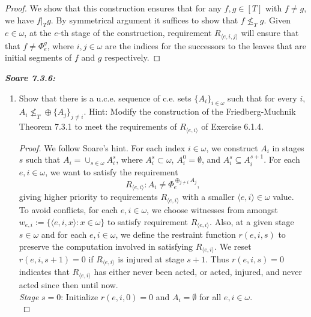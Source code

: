 \documentclass{article}
\begin{document}
\begin{proof}
    We show that this construction ensures that for any $f,g\in[T]$ with
    $f\neq g$, we have $f|_Tg$. By symmetrical argument it suffices to show
    that $f\not\leq_T g$. Given $e\in\omega$, at the $e$-th stage of the
    construction, requirement $R_{\langle e,i,j\rangle}$ will ensure that
    that $f\neq\Phi_e^g$, where $i,j\in\omega$ are the indices for the
    successors to the leaves that are initial segments of $f$ and $g$
    respectively. 
  \end{proof}

\it \textbf{Soare 7.3.6:}
  \begin{enumerate}[label={(\roman*)}]
    \item Show that there is a u.c.e. sequence of c.e. sets
      $\{A_i\}_{i\in\omega}$ such that for every $i$, $A_i\not\leq_T \oplus
      \{A_j\}_{j\neq i}$. Hint: Modify the construction of the
      Friedberg-Muchnik Theorem 7.3.1 to meet the requirements of
      $R_{\langle e,i\rangle}$ of Exercise 6.1.4.

      \begin{proof}
        We follow Soare's hint. For each index $i\in\omega$, we construct
        $A_i$ in stages $s$ such that $A_i=\cup_{s\in\omega}A_i^s$, where
        $A_i^s\subset\omega$, $A_i^0=\emptyset$, and $A_i^s\subseteq
        A_i^{s+1}$. For each $e,i\in\omega$, we want to satisfy the
        requirement \[R_{\langle e,i\rangle}: A_i\neq\Phi_e^{\oplus_{j\neq
        i}A_j},\] giving higher priority to requirements $R_{\langle
        e,i\rangle}$ with a smaller $\langle e,i\rangle\in\omega$ value. \\

        To avoid conflicts, for each $e,i\in\omega$, we choose witnesses
        from amongst $w_{e,i}:=\{\langle e,i,x\rangle: x\in\omega\}$ to
        satisfy requirement $R_{\langle e,i\rangle}$. Also, at a given
        stage $s\in\omega$ and for each $e,i\in\omega$, we define the
        restraint function $r(e,i,s)$ to preserve the computation involved
        in satisfying $R_{\langle e,i\rangle}$. We reset $r(e,i,s+1)=0$ if
        $R_{\langle e,i\rangle}$ is injured at stage $s+1$. Thus
        $r(e,i,s)=0$ indicates that $R_{\langle e,i\rangle}$ has either
        never been acted, or acted, injured, and never acted
        since then until now. \\

        \textit{Stage} $s=0$: Initialize $r(e,i,0)=0$ and $A_i=\emptyset$
        for all $e,i\in\omega$. \\


\end{proof}
\end{enumerate}
\end{document}
